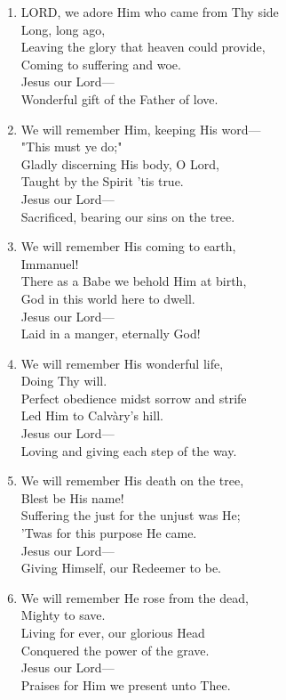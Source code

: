 \documentclass[11pt,a4paper]{article}
\begin{document}
\begin{enumerate}
    \item LORD, we adore Him who came from Thy side \\
        Long, long ago, \\
        Leaving the glory that heaven could provide, \\
        Coming to suffering and woe. \\
        Jesus our Lord--- \\
        Wonderful gift of the Father of love.

    \item We will remember Him, keeping His word--- \\
        "This must ye do;" \\
        Gladly discerning His body, O Lord, \\
        Taught by the Spirit 'tis true. \\
        Jesus our Lord--- \\
        Sacrificed, bearing our sins on the tree.

    \item We will remember His coming to earth, \\
        Immanuel! \\
        There as a Babe we behold Him at birth, \\
        God in this world here to dwell. \\
        Jesus our Lord--- \\
        Laid in a manger, eternally God!

    \item We will remember His wonderful life, \\
        Doing Thy will. \\
        Perfect obedience midst sorrow and strife \\
        Led Him to Calv\`ary's hill. \\
        Jesus our Lord--- \\
        Loving and giving each step of the way.

    \item We will remember His death on the tree, \\
        Blest be His name! \\
        Suffering the just for the unjust was He; \\
        'Twas for this purpose He came. \\
        Jesus our Lord--- \\
        Giving Himself, our Redeemer to be.

    \item We will remember He rose from the dead, \\
        Mighty to save. \\
        Living for ever, our glorious Head \\
        Conquered the power of the grave. \\
        Jesus our Lord--- \\
        Praises for Him we present unto Thee.

\end{enumerate}
\end{document}
